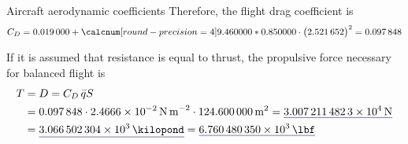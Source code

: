 \documentclass[[12pt,twoside]{book}
\begin{document}
\begin{myExampleX}{Aircraft aerodynamic  coefficients } {}
Therefore, the flight drag coefficient
is
\[
C_D
  = \SI[round-precision=4]{\myDragCoefficientZero}{}
    + 
      \myKpolar
      \cdot \big( \SI[round-precision=3]{\myLiftCoefficient}{} \big)^2
  =\SI[round-precision=4]{\myDragCoefficient}{}
\]


If it is assumed that resistance is equal to thrust,
the propulsive force necessary for balanced flight is
\[
\begin{split}
T & {}= D = C_D \, \bar{q} S
\\
  & {}= \SI[round-precision=4]{\myDragCoefficient}{}
    \cdot \SI[round-precision=3,scientific-notation=true]{\myDynamicPressureBar}{\newton\,\meter^{-2}}
    \cdot \SI[round-precision=1]{\myWingSurfaceMTSD}{\meter^2}
  = \mathunderline{mydarkblue}{ \SI[round-precision=3,scientific-notation=true]{\myDragN}{\newton} }
\\
  & {}= \mathunderline{mydarkblue}{ \SI[round-precision=3,scientific-notation=true]{\myDragKgf}{\kilopond} }
  = \mathunderline{mydarkblue}{ \SI[round-precision=3,scientific-notation=true]{\myDragLbf}{\lbf} }
\end{split}
\]
\end{myExampleX}
\end{document}
